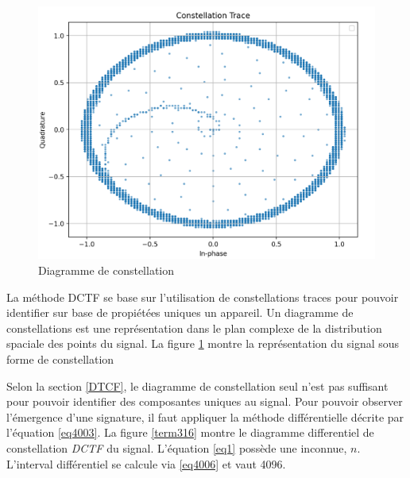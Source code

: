 \begin{figure}[h]
\centering

\includegraphics[scale=0.25]{images/dctf1.png}
\caption{Diagramme de constellation}\label{term314}
\end{figure}


La méthode DCTF se base sur l'utilisation de constellations traces pour pouvoir identifier sur base de propiétées uniques un appareil. Un diagramme de constellations est une représentation dans le plan complexe de la distribution spaciale des points du signal. La figure \ref{term314} montre la représentation  du signal sous forme de constellation



Selon la section \ref{DTCF}, le diagramme de constellation seul n'est pas suffisant pour pouvoir identifier des composantes uniques au signal. Pour pouvoir observer l'émergence d'une signature, il faut appliquer la méthode différentielle décrite par l'équation \ref{eq4003}. La figure \ref{term316} montre le diagramme differentiel de constellation \textit{DCTF} du signal. L'équation \ref{eq1} possède une inconnue, $n$. L'interval différentiel se calcule via \ref{eq4006} et vaut 4096.

